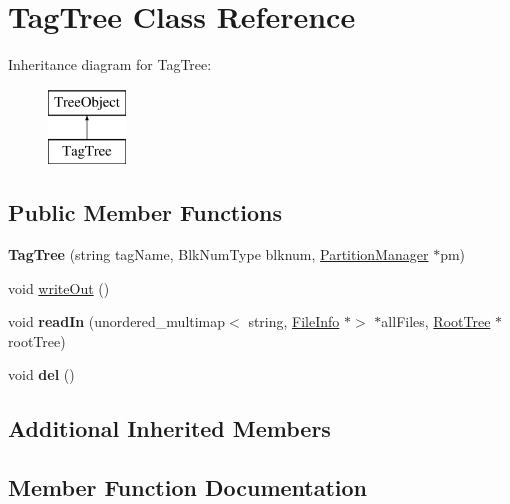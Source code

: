 \hypertarget{classTagTree}{}\section{Tag\+Tree Class Reference}
\label{classTagTree}
Inheritance diagram for Tag\+Tree\+:\begin{figure}[H]
\begin{center}
\leavevmode
\includegraphics[height=2.000000cm]{classTagTree}
\end{center}
\end{figure}
\subsection*{Public Member Functions}
\begin{DoxyCompactItemize}
\item 
\mbox{\label{classTagTree_a80b23fa47a18727a248c3db1e8b2ed83}} 
{\bfseries Tag\+Tree} (string tag\+Name, Blk\+Num\+Type blknum, \mbox{\hyperlink{classPartitionManager}{Partition\+Manager}} $\ast$pm)
\item 
void \mbox{\hyperlink{classTagTree_ae316c2517c607547f02ce43b63a6316d}{write\+Out}} ()
\item 
\mbox{\label{classTagTree_a2e72921ccc19667331c64d3d0100b269}} 
void {\bfseries read\+In} (unordered\+\_\+multimap$<$ string, \mbox{\hyperlink{classFileInfo}{File\+Info}} $\ast$$>$ $\ast$all\+Files, \mbox{\hyperlink{classRootTree}{Root\+Tree}} $\ast$root\+Tree)
\item 
\mbox{\label{classTagTree_ad8108969f4d28b938e55c8339f19db35}} 
void {\bfseries del} ()
\end{DoxyCompactItemize}
\subsection*{Additional Inherited Members}


\subsection{Member Function Documentation}
\mbox{\label{classTagTree_ae316c2517c607547f02ce43b63a6316d}} 
